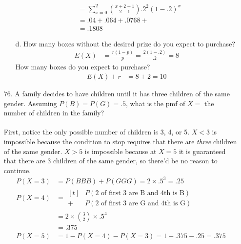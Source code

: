 \documentclass[letterpaper,12pt]{article}
\newcommand{\nb}[3]{%
  \binom{#1 + #2 - 1}{#2 - 1}{#3}^{#2}(1 - #3)^{#1}%
}
\begin{document}
\begin{enumerate}
\begin{enumerate}
\begin{align*}
          &= \sum_{x = 0}^{2} \nb{x}{2}{.2} \\
          &= .04 + .064 + .0768 + \\
          &= .1808
        \end{align*}
      \item[d.]
        How many boxes without the desired prize do you expect to purchase?
        \begin{align*}
          E(X) &= \frac{r(1 - p)}{p} = \frac{2(1 - .2)}{.2} = 8
        \end{align*}
        How many boxes do you expect to purchase?
        \begin{align*}
          E(X) + r &= 8 + 2 = 10
        \end{align*}
    \end{enumerate}
  \item[76.]
    A family decides to have children until it has three children of the same gender. Assuming $P(B) = P(G) = .5$, what is the pmf of $X =$ the number of children in the family?
    \\ \\
    First, notice the only possible number of children is 3, 4, or 5. $X < 3$ is impossible because the condition to stop requires that there are \textit{three} children of the same gender. $X > 5$ is impossible because at $X = 5$ it is guaranteed that there are 3 children of the same gender, so there'd be no reason to continue.
    \begin{align*}
      P(X = 3) &= P(BBB) + P(GGG) = 2 \times .5^3 = .25 \\
      P(X = 4) &= \begin{aligned}[t]
        &P(\text{2 of first 3 are B and 4th is B}) \\
        + &P(\text{2 of first 3 are G and 4th is G})
      \end{aligned} \\
      &= 2 \times \binom{3}{2} \times .5^4 \\
      &= .375 \\
      P(X = 5) &= 1 - P(X = 4) - P(X = 3) = 1 - .375 - .25 = .375
    \end{align*}
\end{enumerate}
\end{document}
